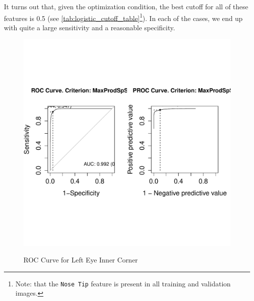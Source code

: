 \documentclass[conference]{IEEEtran}
\begin{document}
It turns out that, given the optimization condition, the best cutoff for all of these features is 0.5 (see \cref{tab:logistic_cutoff_table}\footnote{Note: that the \texttt{Nose Tip} feature is present in all training and validation images.}).  In each of the cases, we end up with quite a large sensitivity and a reasonable specificity.

\begin{figure}[!htb]
  \centering
  \caption{ROC Curve for Left Eye Inner Corner}
  \includegraphics[scale=.5]{roc_left_eye_inner_corner.pdf}
  \label{fig:roc_left_eye_inner_corner}
\end{figure}
\end{document}
